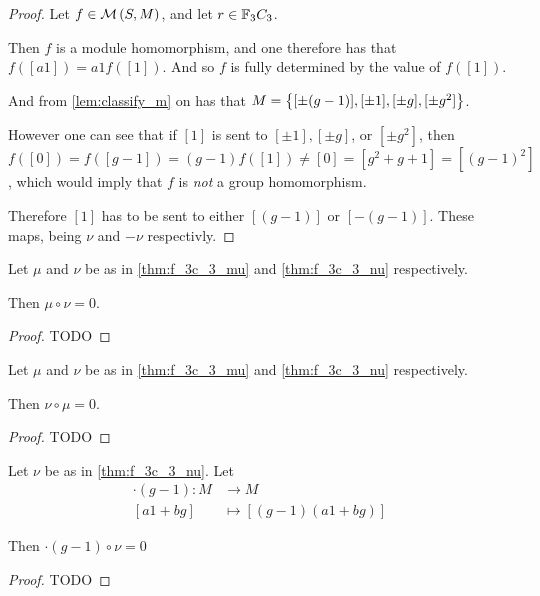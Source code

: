 \begin{proof}
    Let \( f \in {\mathcal{M}}\left( S, M \right) \), and let \( r \in {\mathbb{F}}_3C_3 \).
    
    Then \( f \) is a module homomorphism, and one therefore has that \( f([a1]) = a1 f([1]) \). And so \( f \) is fully determined by the value of \( f([1]) \). 
    
    And from \autoref{lem:classify_m} on has that \( M = \left\{ [\pm (g - 1)], [\pm 1], [\pm g], [\pm g^2] \right\} \).

    However one can see that if \( [1] \) is sent to \( [\pm 1], [\pm g] \), or \( [\pm g^2] \), then \( f([0]) = f([g - 1]) = (g - 1)f([1]) \neq [0] = [g^2 + g + 1] = [(g - 1)^2] \), which would imply that \( f \) is \emph{not} a group homomorphism.

    Therefore \( [1] \) has to be sent to either \( [(g - 1)] \) or \( [-(g - 1)] \). These maps, being \( \nu \) and \( -\nu \) respectivly.
\end{proof}

\begin{lemma} \label{thm:f_3c_3_mu_circ_nu_zero}
    Let \( \mu \) and \( \nu \) be as in \autoref{thm:f_3c_3_mu} and \autoref{thm:f_3c_3_nu} respectively.

    Then \( \mu \circ \nu = 0 \).
\end{lemma}
\begin{proof}
    TODO
\end{proof}

\begin{lemma} \label{thm:f_3c_3_nu_circ_mu_zero}
    Let \( \mu \) and \( \nu \) be as in \autoref{thm:f_3c_3_mu} and \autoref{thm:f_3c_3_nu} respectively.

    Then \( \nu \circ \mu = 0 \).
\end{lemma}
\begin{proof}
    TODO
\end{proof}

\begin{lemma} \label{lem:g-1_circ_nu_equals_zero}
    Let \( \nu \) be as in \autoref{thm:f_3c_3_nu}. Let
    \begin{align*}
        \cdot(g - 1): M &\to M \\
        [a1 + bg] &\mapsto [(g - 1)(a1 + bg)]
    \end{align*}

    Then \( \cdot(g - 1) \circ \nu = 0 \) 
\end{lemma}
\begin{proof}
    TODO
\end{proof}

